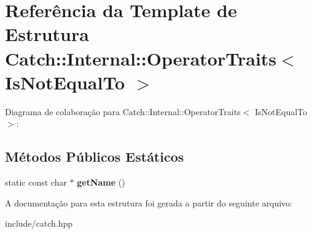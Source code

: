 \hypertarget{structCatch_1_1Internal_1_1OperatorTraits_3_01IsNotEqualTo_01_4}{}\section{Referência da Template de Estrutura Catch\+:\+:Internal\+:\+:Operator\+Traits$<$ Is\+Not\+Equal\+To $>$}
\label{structCatch_1_1Internal_1_1OperatorTraits_3_01IsNotEqualTo_01_4}


Diagrama de colaboração para Catch\+:\+:Internal\+:\+:Operator\+Traits$<$ Is\+Not\+Equal\+To $>$\+:
\subsection*{Métodos Públicos Estáticos}
\begin{DoxyCompactItemize}
\item 
static const char $\ast$ {\bfseries get\+Name} ()\hypertarget{structCatch_1_1Internal_1_1OperatorTraits_3_01IsNotEqualTo_01_4_a54a795b8bf7c80a9fdbc7b81f39133b4}{}\label{structCatch_1_1Internal_1_1OperatorTraits_3_01IsNotEqualTo_01_4_a54a795b8bf7c80a9fdbc7b81f39133b4}

\end{DoxyCompactItemize}


A documentação para esta estrutura foi gerada a partir do seguinte arquivo\+:\begin{DoxyCompactItemize}
\item 
include/catch.\+hpp\end{DoxyCompactItemize}

